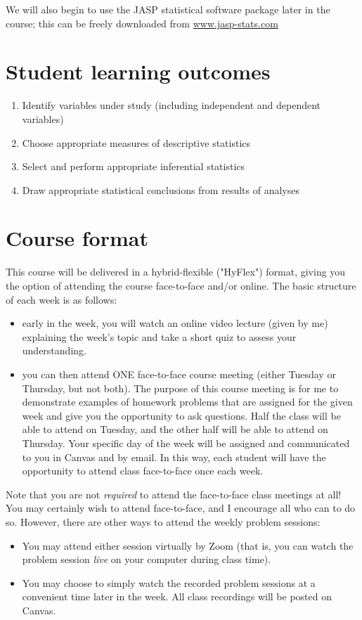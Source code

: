 \documentclass[10pt]{article}
\begin{document}
We will also begin to use the JASP statistical software package later in the course; this can be freely downloaded from \href{http://www.jasp-stats.com}{www.jasp-stats.com}

\section*{Student learning outcomes}
\label{sec:org6656b15}
\begin{enumerate}
\item Identify variables under study (including independent and dependent variables)
\item Choose appropriate measures of descriptive statistics
\item Select and perform appropriate inferential statistics
\item Draw appropriate statistical conclusions from results of analyses
\end{enumerate}

\section*{Course format}
\label{sec:orgcccf92a}

This course will be delivered in a hybrid-flexible ("HyFlex") format, giving you the option of attending the course face-to-face and/or online. The basic structure of each week is as follows:

\begin{itemize}
\item early in the week, you will watch an online video lecture (given by me) explaining the week's topic and take a short quiz to assess your understanding.

\item you can then attend ONE face-to-face course meeting (either Tuesday or Thursday, but not both). The purpose of this course meeting is for me to demonstrate examples of homework problems that are assigned for the given week and give you the opportunity to ask questions. Half the class will be able to attend on Tuesday, and the other half will be able to attend on Thursday. Your specific day of the week will be assigned and communicated to you in Canvas and by email. In this way, each student will have the opportunity to attend class face-to-face once each week.
\end{itemize}

Note that you are not \emph{required} to attend the face-to-face class meetings at all! You may certainly wish to attend face-to-face, and I encourage all who can to do so. However, there are other ways to attend the weekly problem sessions:
\begin{itemize}
\item You may attend either session virtually by Zoom (that is, you can watch the problem session \emph{live} on your computer during class time).
\item You may choose to simply watch the recorded problem sessions at a convenient time later in the week. All class recordings will be posted on Canvas.
\end{itemize}
\end{document}
